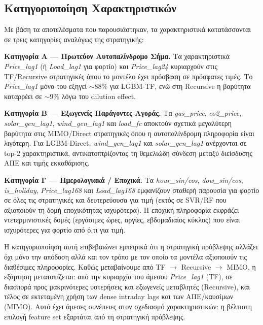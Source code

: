 \subsection{Κατηγοριοποίηση Χαρακτηριστικών}
\label{sec:fi_categories}

Με βάση τα αποτελέσματα που παρουσιάστηκαν, τα χαρακτηριστικά κατατάσσονται
σε τρεις κατηγορίες αναλόγως της στρατηγικής:

\textbf{Κατηγορία Α --- Πρωτεύον Αυτοπαλίνδρομο Σήμα.}
Τα χαρακτηριστικά \textit{Price\_lag1} (ή \textit{Load\_lag1} για φορτίο) και
\textit{Price\_lag24} κυριαρχούν στις TF/Recursive στρατηγικές όπου το μοντέλο
έχει πρόσβαση σε πρόσφατες τιμές. Το \textit{Price\_lag1} μόνο του εξηγεί
${\sim}88\%$ για LGBM-TF, ενώ στη Recursive η βαρύτητα καταρρέει σε ${\sim}9\%$
λόγω του dilution effect.

\textbf{Κατηγορία Β --- Εξωγενείς Παράγοντες Αγοράς.}
Τα \textit{gas\_price}, \textit{co2\_price}, \textit{solar\_gen\_lag1},
\textit{wind\_gen\_lag1} και \textit{load\_fc} αποκτούν σχετικά μεγαλύτερη
βαρύτητα στις MIMO/Direct στρατηγικές όπου η αυτοπαλίνδρομη πληροφορία είναι
λιγότερη. Για LGBM-Direct, \textit{wind\_gen\_lag1} και \textit{solar\_gen\_lag1}
ανέρχονται σε top-2 χαρακτηριστικά, αντικατοπτρίζοντας τη θεμελιώδη σύνδεση
μεταξύ διείσδυσης ΑΠΕ και τιμής εκκαθάρισης.

\textbf{Κατηγορία Γ --- Ημερολογιακά / Εποχικά.}
Τα \textit{hour\_sin/cos}, \textit{dow\_sin/cos}, \textit{is\_holiday},
\textit{Price\_lag168} και \textit{Load\_lag168} εμφανίζουν σταθερή παρουσία
για φορτίο σε όλες τις στρατηγικές και δευτερεύουσα για τιμή (εκτός σε SVR/RF
που αξιοποιούν τη δομή εποχικότητας ισχυρότερα). Η εποχική πληροφορία εκφράζει
ντετερμινιστικές δομές (εργάσιμες ώρες, αργίες, εβδομαδιαίος κύκλος) που είναι
ισχυρότερες για φορτίο από ό,τι για τιμή.

Η κατηγοριοποίηση αυτή επιβεβαιώνει εμπειρικά ότι η στρατηγική πρόβλεψης
αλλάζει όχι μόνο την απόδοση αλλά και τον τρόπο με τον οποίο τα μοντέλα
αξιοποιούν τις διαθέσιμες πληροφορίες. Καθώς μεταβαίνουμε από TF $\to$
Recursive $\to$ MIMO, η εξάρτηση μετατοπίζεται: από την κυριαρχία του άμεσου
\textit{Price\_lag1} (TF), σε διασπορά προς μακρινότερες υστερήσεις και
εξωγενείς μεταβλητές (Recursive), και τέλος σε εκτεταμένη χρήση των dense
intraday lags και των ΑΠΕ/καυσίμων (MIMO). Αυτό έχει άμεσες συνέπειες στον
σχεδιασμό χαρακτηριστικών: η βέλτιστη επιλογή feature set εξαρτάται από τη
στρατηγική πρόβλεψης.

